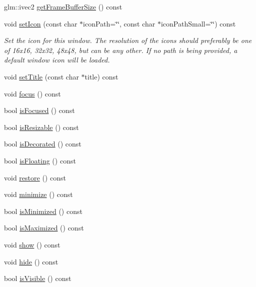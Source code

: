 \begin{DoxyCompactItemize}
\item 
glm\+::ivec2 \mbox{\hyperlink{classec_1_1_window_a855a303eca483fc69ad278df77f1de4c}{get\+Frame\+Buffer\+Size}} () const
\item 
void \mbox{\hyperlink{classec_1_1_window_a906d0c0d6b6c50bb98de694b5a09dc17}{set\+Icon}} (const char $\ast$icon\+Path=\char`\"{}\char`\"{}, const char $\ast$icon\+Path\+Small=\char`\"{}\char`\"{}) const
\begin{DoxyCompactList}\small\item\em Set the icon for this window. The resolution of the icons should preferably be one of 16x16, 32x32, 48x48, but can be any other. If no path is being provided, a default window icon will be loaded. \end{DoxyCompactList}\item 
void \mbox{\hyperlink{classec_1_1_window_aad364a4e56d55628c91deffa1a3a64d7}{set\+Title}} (const char $\ast$title) const
\item 
void \mbox{\hyperlink{classec_1_1_window_a927c041d6913c385efef327b091d5f4f}{focus}} () const
\item 
bool \mbox{\hyperlink{classec_1_1_window_ac40c6391e9edd720407f8a77d4ee546a}{is\+Focused}} () const
\item 
bool \mbox{\hyperlink{classec_1_1_window_a8af5e954522cc427ab1fe5b6a28f5328}{is\+Resizable}} () const
\item 
bool \mbox{\hyperlink{classec_1_1_window_a2761ae9079a18f5d62b2ed4715fd9bd1}{is\+Decorated}} () const
\item 
bool \mbox{\hyperlink{classec_1_1_window_a8e0c04a4c922d351246af64a5d439ba3}{is\+Floating}} () const
\item 
void \mbox{\hyperlink{classec_1_1_window_a30b3a1e8d3b0f8ae82ee9e4e0235f174}{restore}} () const
\item 
void \mbox{\hyperlink{classec_1_1_window_a03862c4545b0ad415438f4b8c26849ef}{minimize}} () const
\item 
bool \mbox{\hyperlink{classec_1_1_window_aa9de125288991354fdeb781e6d3f7a12}{is\+Minimized}} () const
\item 
bool \mbox{\hyperlink{classec_1_1_window_aa4a8cfb938d1a28864e8d0cc265dd96e}{is\+Maximized}} () const
\item 
void \mbox{\hyperlink{classec_1_1_window_abedfe871ebba65fa932f2eb9117373a0}{show}} () const
\item 
void \mbox{\hyperlink{classec_1_1_window_ae03af70ef60b666e60533ede07fad8cf}{hide}} () const
\item 
bool \mbox{\hyperlink{classec_1_1_window_a0f4ab1e221cbf5ce5b5a1183a51e38cd}{is\+Visible}} () const

\end{DoxyCompactItemize}
